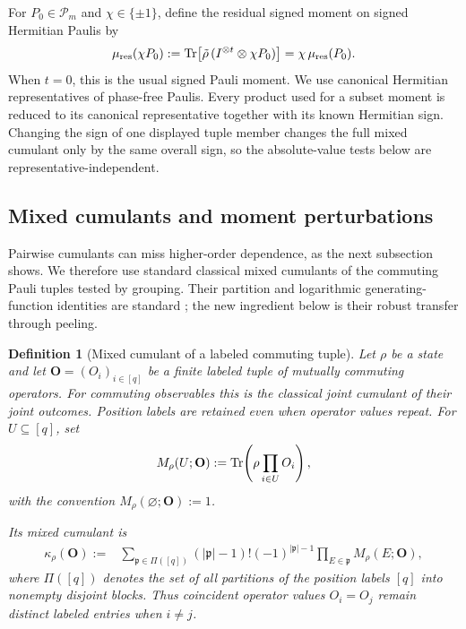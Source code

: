 \documentclass[
  aps,
  prx,
  reprint,
  superscriptaddress,
  amsmath,
  amssymb,
  nofootinbib,
  longbibliography
]{revtex4-2}
\newtheorem{definition}[theorem]{Definition}
\newcommand{\Pc}{\mathcal{P}}
\begin{document}
For $P_0\in\Pc_m$ and $\chi\in\{\pm1\}$, define the residual signed moment
on signed Hermitian Paulis by
\begin{equation}
\mu_{\mathrm{res}}(\chi P_0)
:=
\Tr\!\left[
\tilde\rho\,
(I^{\otimes t}\otimes \chi P_0)
\right]
=
\chi\,\mu_{\mathrm{res}}(P_0).
\label{eq:supp-residual-signed-moment}
\end{equation}
When $t=0$, this is the usual signed Pauli moment.  We use canonical Hermitian
representatives of phase-free Paulis.  Every product used for a subset moment
is reduced to its canonical representative together with its known Hermitian
sign.  Changing the sign of one displayed tuple member changes the full mixed
cumulant only by the same overall sign, so the absolute-value tests below are
representative-independent.

\subsection{Mixed cumulants and moment perturbations}
\label{sec:supp-mixed-cumulants}
Pairwise cumulants can miss higher-order dependence, as the next subsection
shows.  We therefore use standard classical mixed cumulants of the commuting
Pauli tuples tested by grouping.  Their partition and logarithmic
generating-function identities are standard
\cite{doubilet1972foundations,smith2020multivariateKstatistics}; the new
ingredient below is their robust transfer through peeling.

\begin{definition}[Mixed cumulant of a labeled commuting tuple]
\label{def:supp-mixed-cumulant-sector-set}
Let $\rho$ be a state and let
$\mathbf O=(O_i)_{i\in[q]}$
be a finite labeled tuple of mutually commuting operators.  For commuting
observables this is the classical joint cumulant of their joint outcomes.
Position labels are retained even when operator values repeat.  For
$U\subseteq[q]$, set
\begin{equation}
M_\rho(U;\mathbf O)
:=
\Tr\!\left(\rho\prod_{i\in U}O_i\right),
\label{eq:supp-signed-pauli-moment-general}
\end{equation}
with the convention $M_\rho(\varnothing;\mathbf O):=1$.

Its \emph{mixed cumulant} is
\begin{equation}
\begin{aligned}
\kappa_\rho(\mathbf O)
:={}&
\sum_{\mathfrak p\in \Pi([q])}
(|\mathfrak p|-1)!(-1)^{|\mathfrak p|-1}
\prod_{E\in \mathfrak p}
M_\rho(E;\mathbf O),
\end{aligned}
\label{eq:supp-general-mixed-cumulant}
\end{equation}
where $\Pi([q])$ denotes the set of all partitions of the position labels
$[q]$ into nonempty disjoint blocks.  Thus coincident operator values
$O_i=O_j$ remain distinct labeled entries when $i\ne j$.
\end{definition}
\end{document}
